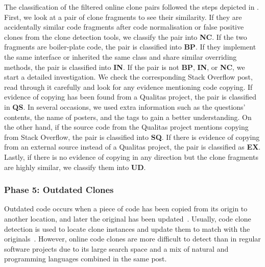 \documentclass[10pt,journal,compsoc]{IEEEtran}
\begin{document}
The classification of the filtered online clone pairs followed the steps
depicted in . First, we look at a pair of clone
fragments to see their similarity. If they are accidentally similar code fragments after
code normalisation or false positive clones from the clone detection tools, we
classify the pair into \textbf{NC}. If the two fragments are boiler-plate code,
the pair is classified into \textbf{BP}. If they implement the same interface or
inherited the same class and share similar overriding methods, the pair is
classified into \textbf{IN}. If the pair is not \textbf{BP}, \textbf{IN}, or
\textbf{NC}, we start a detailed investigation. We check the corresponding Stack
Overflow post, read through it carefully and look for any evidence mentioning
code copying. If evidence of copying has been found from a Qualitas project, the
pair is classified in \textbf{QS}. In several occasions, we used extra
information such as the questions' contents, the name of posters, and the tags to gain a
better understanding. On the other hand, if the source code from the Qualitas
project mentions copying from Stack Overflow, the pair is classified into
\textbf{SQ}. If there is evidence of copying from an external source instead of
a Qualitas project, the pair is classified as \textbf{EX}. Lastly, if there
is no evidence of copying in any direction but the clone fragments are highly
similar, we classify them into \textbf{UD}.

\subsubsection{Phase 5: Outdated Clones} Outdated code occurs when a piece of code
has been copied from its origin to another location, and later the original has
been updated~\cite{Xia2014}. Usually, code clone detection is used to locate
clone instances and update them to match with the originals~\cite{Bellon2007}.
However, online code clones are more difficult to detect than in regular
software projects due to its large search space and a mix of natural and
programming languages combined in the same post.
\end{document}
